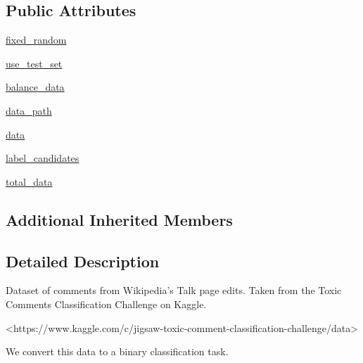 \subsection*{Public Attributes}
\begin{DoxyCompactItemize}
\item 
\hyperlink{classparlai_1_1tasks_1_1dialogue__safety_1_1agents_1_1WikiToxicCommentsTeacher_a0a82908d2bd950c6bc497f6e095b06b7}{fixed\+\_\+random}
\item 
\hyperlink{classparlai_1_1tasks_1_1dialogue__safety_1_1agents_1_1WikiToxicCommentsTeacher_ad43ba64edd570e5fb5e4a4a0a68865cf}{use\+\_\+test\+\_\+set}
\item 
\hyperlink{classparlai_1_1tasks_1_1dialogue__safety_1_1agents_1_1WikiToxicCommentsTeacher_a9eeb881196ce42d8994dc4884fd9113a}{balance\+\_\+data}
\item 
\hyperlink{classparlai_1_1tasks_1_1dialogue__safety_1_1agents_1_1WikiToxicCommentsTeacher_a004f00e27fe4d6f437edab31e99018f5}{data\+\_\+path}
\item 
\hyperlink{classparlai_1_1tasks_1_1dialogue__safety_1_1agents_1_1WikiToxicCommentsTeacher_acfbf40cbf6be048c6667f4712e1db5c3}{data}
\item 
\hyperlink{classparlai_1_1tasks_1_1dialogue__safety_1_1agents_1_1WikiToxicCommentsTeacher_a81bfea7e10ad4273964a26599dcce45d}{label\+\_\+candidates}
\item 
\hyperlink{classparlai_1_1tasks_1_1dialogue__safety_1_1agents_1_1WikiToxicCommentsTeacher_a027ef2d3141fc6e055b17f3ce7a3c7c5}{total\+\_\+data}
\end{DoxyCompactItemize}
\subsection*{Additional Inherited Members}


\subsection{Detailed Description}
\begin{DoxyVerb}Dataset of comments from Wikipedia's Talk page edits. Taken from the Toxic Comments
Classification Challenge on Kaggle.

<https://www.kaggle.com/c/jigsaw-toxic-comment-classification-challenge/data>

We convert this data to a binary classification task.
\end{DoxyVerb}
 

